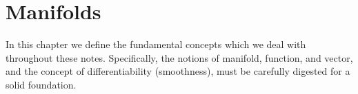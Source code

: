 \documentclass[../main]{subfiles}
\begin{document}
\chapter{Manifolds}\label{ch01}
In this chapter we define the fundamental concepts which we deal with throughout these notes. Specifically, the notions of manifold, function, and vector, and the concept of differentiability (smoothness), must be carefully digested for a solid foundation.








\end{document}
